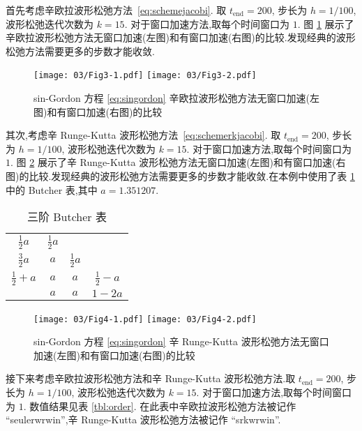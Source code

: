 首先考虑辛欧拉波形松弛方法~\eqref{eq:schemejacobi}. 取 $t_{\text{end}} = 200$, 步长为 $h = 1/100$, 波形松弛迭代次数为 $k=15$. 对于窗口加速方法,取每个时间窗口为 $1$. 图 \ref{fig:ex1seucom} 展示了辛欧拉波形松弛方法无窗口加速(左图)和有窗口加速(右图)的比较.发现经典的波形松弛方法需要更多的步数才能收敛.

\begin{figure}[h!]
  \centering
  \texttt{[image: 03/Fig3-1.pdf]}
  \texttt{[image: 03/Fig3-2.pdf]}
  \caption{sin-Gordon 方程 \eqref{eq:singordon} 辛欧拉波形松弛方法无窗口加速(左图)和有窗口加速(右图)的比较}
  \label{fig:ex1seucom}
\end{figure}

其次,考虑辛 Runge-Kutta 波形松弛方法~\eqref{eq:schemerkjacobi}. 取 $t_{\text{end}} = 200$, 步长为 $h = 1/100$, 波形松弛迭代次数为 $k=15$. 对于窗口加速方法,取每个时间窗口为 $1$. 图 \ref{fig:ex1srkcom} 展示了辛 Runge-Kutta 波形松弛方法无窗口加速(左图)和有窗口加速(右图)的比较.发现经典的波形松弛方法需要更多的步数才能收敛.在本例中使用了表 \ref{tbl:rk} 中的 Butcher 表,其中 $a = 1.351207$.

\begin{table}[h!]
  \centering
  \caption{三阶 Butcher 表}
  \label{tbl:rk}
  \begin{tabular}{c|ccc}
    $\frac{1}{2}a$ & $\frac{1}{2}a$ & & \\
    $\frac{3}{2}a$ & $a$ &$\frac{1}{2}a$  & \\
    $\frac{1}{2} + a$ & $a$ & $a$ &$\frac{1}{2}-a$\\
    \hline
    & $a$ &$a$ & $1-2a$\\
  \end{tabular}
\end{table}

\begin{figure}[h!]
  \centering
  \texttt{[image: 03/Fig4-1.pdf]}
  \texttt{[image: 03/Fig4-2.pdf]}
  \caption{sin-Gordon 方程 \eqref{eq:singordon} 辛 Runge-Kutta 波形松弛方法无窗口加速(左图)和有窗口加速(右图)的比较}
  \label{fig:ex1srkcom}
\end{figure}

接下来考虑辛欧拉波形松弛方法和辛 Runge-Kutta 波形松弛方法.取 $t_{\text{end}} = 200$, 步长为 $h = 1/100$, 波形松弛迭代次数为 $k=15$. 对于窗口加速方法,取每个时间窗口为 $1$. 数值结果见表 \ref{tbl:order}. 在此表中辛欧拉波形松弛方法被记作 ``seulerwrwin'',辛 Runge-Kutta 波形松弛方法被记作 ``srkwrwin''.

